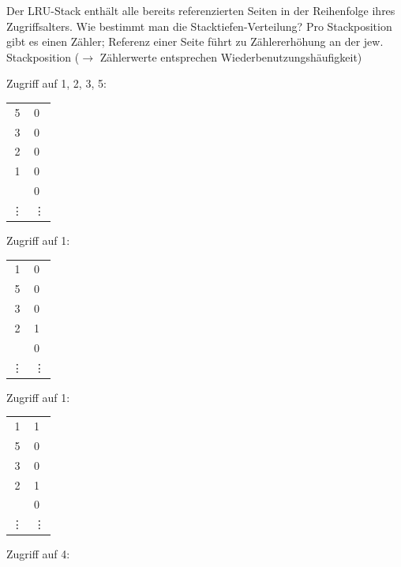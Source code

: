 \begin{enumerate}[a)]
\begin{solution}
Der LRU-Stack enthält alle bereits referenzierten Seiten in der Reihenfolge ihres Zugriffsalters.
Wie bestimmt man die Stacktiefen-Verteilung? Pro Stackposition gibt es einen Zähler; Referenz einer Seite führt zu Zählererhöhung an der jew. Stackposition ($\rightarrow$ Zählerwerte entsprechen Wiederbenutzungshäufigkeit)


    \begin{minipage}{0.28\textwidth}
        \center
        Zugriff auf 1, 2, 3, 5:

        \begin{tabular}{ | c | l}
        	\cline{1-1}
        	5      & 0      \\ \cline{1-1}
        	3      & 0      \\ \cline{1-1}
        	2      & 0      \\ \cline{1-1}
        	1      & 0      \\ \cline{1-1}
        	       & 0      \\ \cline{1-1}
        	\vdots & \vdots \\ \cline{1-1}
        \end{tabular}
    \end{minipage}
    \begin{minipage}{0.22\textwidth}
        \center
        Zugriff auf 1:

        \begin{tabular}{ | c | l}
        	\cline{1-1}
        	1      & 0      \\ \cline{1-1}
        	5      & 0      \\ \cline{1-1}
        	3      & 0      \\ \cline{1-1}
        	2      & 1      \\ \cline{1-1}
        	       & 0      \\ \cline{1-1}
        	\vdots & \vdots \\ \cline{1-1}
        \end{tabular}
    \end{minipage}
    \begin{minipage}{0.22\textwidth}
        \center
        Zugriff auf 1:

        \begin{tabular}{ | c | l}
        	\cline{1-1}
        	1      & 1      \\ \cline{1-1}
        	5      & 0      \\ \cline{1-1}
        	3      & 0      \\ \cline{1-1}
        	2      & 1      \\ \cline{1-1}
        	       & 0      \\ \cline{1-1}
        	\vdots & \vdots \\ \cline{1-1}
        \end{tabular}
    \end{minipage}
    \begin{minipage}{0.22\textwidth}
        \center
        Zugriff auf 4:


\end{minipage}
\end{solution}
\end{enumerate}
